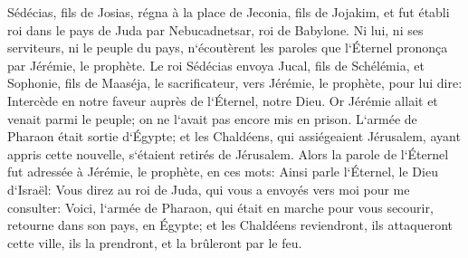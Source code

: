 \verse Sédécias, fils de Josias, régna à la place de Jeconia, fils de Jojakim, et fut établi roi dans le pays de Juda par Nebucadnetsar, roi de Babylone. 
\verse Ni lui, ni ses serviteurs, ni le peuple du pays, n`écoutèrent les paroles que l`Éternel prononça par Jérémie, le prophète. 
\verse Le roi Sédécias envoya Jucal, fils de Schélémia, et Sophonie, fils de Maaséja, le sacrificateur, vers Jérémie, le prophète, pour lui dire: Intercède en notre faveur auprès de l`Éternel, notre Dieu. 
\verse Or Jérémie allait et venait parmi le peuple; on ne l`avait pas encore mis en prison. 
\verse L`armée de Pharaon était sortie d`Égypte; et les Chaldéens, qui assiégeaient Jérusalem, ayant appris cette nouvelle, s`étaient retirés de Jérusalem. 
\verse Alors la parole de l`Éternel fut adressée à Jérémie, le prophète, en ces mots: 
\verse Ainsi parle l`Éternel, le Dieu d`Israël: Vous direz au roi de Juda, qui vous a envoyés vers moi pour me consulter: Voici, l`armée de Pharaon, qui était en marche pour vous secourir, retourne dans son pays, en Égypte; 
\verse et les Chaldéens reviendront, ils attaqueront cette ville, ils la prendront, et la brûleront par le feu. 
